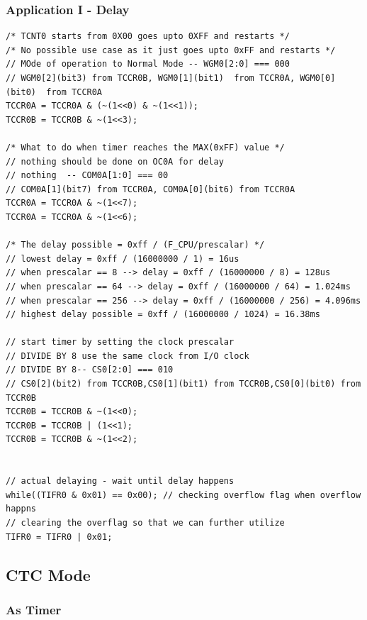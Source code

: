 \documentclass{article}
\begin{document}
\subsubsection{Application I - Delay}
\begin{verbatim}
/* TCNT0 starts from 0X00 goes upto 0XFF and restarts */
/* No possible use case as it just goes upto 0xFF and restarts */
// MOde of operation to Normal Mode -- WGM0[2:0] === 000
// WGM0[2](bit3) from TCCR0B, WGM0[1](bit1)  from TCCR0A, WGM0[0](bit0)  from TCCR0A
TCCR0A = TCCR0A & (~(1<<0) & ~(1<<1));
TCCR0B = TCCR0B & ~(1<<3);

/* What to do when timer reaches the MAX(0xFF) value */
// nothing should be done on OC0A for delay
// nothing  -- COM0A[1:0] === 00
// COM0A[1](bit7) from TCCR0A, COM0A[0](bit6) from TCCR0A
TCCR0A = TCCR0A & ~(1<<7);
TCCR0A = TCCR0A & ~(1<<6);
    
/* The delay possible = 0xff / (F_CPU/prescalar) */
// lowest delay = 0xff / (16000000 / 1) = 16us
// when prescalar == 8 --> delay = 0xff / (16000000 / 8) = 128us
// when prescalar == 64 --> delay = 0xff / (16000000 / 64) = 1.024ms
// when prescalar == 256 --> delay = 0xff / (16000000 / 256) = 4.096ms
// highest delay possible = 0xff / (16000000 / 1024) = 16.38ms

// start timer by setting the clock prescalar
// DIVIDE BY 8 use the same clock from I/O clock
// DIVIDE BY 8-- CS0[2:0] === 010
// CS0[2](bit2) from TCCR0B,CS0[1](bit1) from TCCR0B,CS0[0](bit0) from TCCR0B
TCCR0B = TCCR0B & ~(1<<0);
TCCR0B = TCCR0B | (1<<1);
TCCR0B = TCCR0B & ~(1<<2);


// actual delaying - wait until delay happens
while((TIFR0 & 0x01) == 0x00); // checking overflow flag when overflow happns
// clearing the overflag so that we can further utilize
TIFR0 = TIFR0 | 0x01;
\end{verbatim}

\subsection{CTC Mode}
\subsubsection{As Timer}
\end{document}
